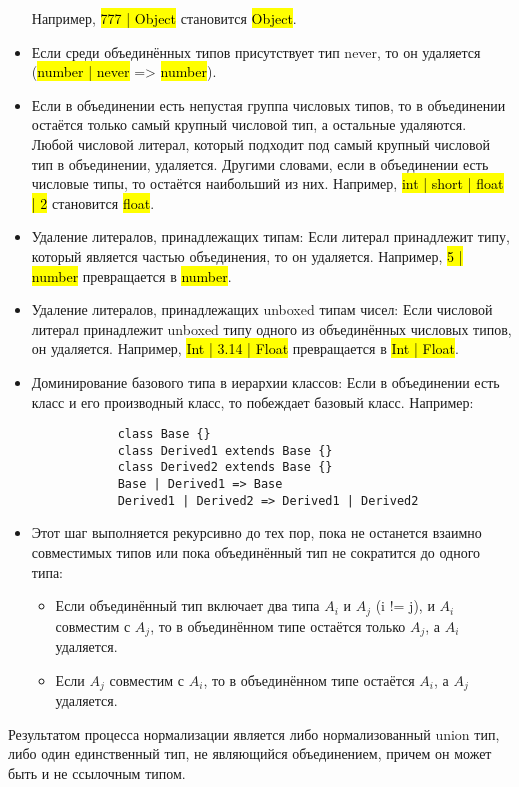 \begin{itemize}[left=2em]
    Например, \hl{777 | Object} становится \hl{Object}.
    \item Если среди объединённых типов присутствует тип never, то он удаляется (\hl{number | never} => \hl{number}).
    \item Если в объединении есть непустая группа числовых типов, то в объединении остаётся только самый крупный числовой тип,
    а остальные удаляются.
    Любой числовой литерал, который подходит под самый крупный числовой тип в объединении, удаляется.
    Другими словами, если в объединении есть числовые типы, то остаётся наибольший из них.
    Например, \hl{int | short | float | 2} становится \hl{float}.
    \item Удаление литералов, принадлежащих типам: Если литерал принадлежит типу, который является частью объединения,
    то он удаляется.
    Например, \hl{5 | number} превращается в \hl{number}.
    \item Удаление литералов, принадлежащих unboxed типам чисел: Если числовой литерал принадлежит unboxed типу одного
    из объединённых числовых типов, он удаляется.
    Например, \hl{Int | 3.14 | Float} превращается в \hl{Int | Float}.
    \item Доминирование базового типа в иерархии классов: Если в объединении есть класс и его производный класс,
    то побеждает базовый класс.
    Например:
        \begin{lstlisting}
            class Base {}
            class Derived1 extends Base {}
            class Derived2 extends Base {}
            Base | Derived1 => Base
            Derived1 | Derived2 => Derived1 | Derived2
        \end{lstlisting}
    \item Этот шаг выполняется рекурсивно до тех пор, пока не останется взаимно совместимых типов или пока объединённый
    тип не сократится до одного типа:
    \begin{itemize}[left=2em]
        \item Если объединённый тип включает два типа $A_i$ и $A_j$ (i != j), и $A_i$ совместим с $A_j$, то в объединённом типе
    остаётся только $A_j$, а $A_i$ удаляется.
        \item Если $A_j$ совместим с $A_i$, то в объединённом типе остаётся $A_i$, а $A_j$ удаляется.
    \end{itemize}
\end{itemize}

Результатом процесса нормализации является либо нормализованный union тип, либо один единственный тип, не являющийся
объединением, причем он может быть и не ссылочным типом.

